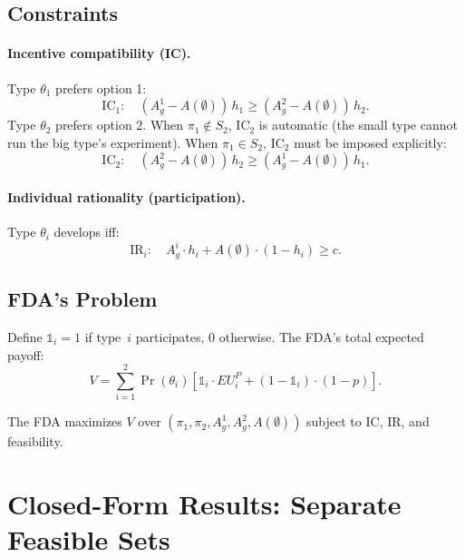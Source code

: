 \documentclass[12pt,a4paper]{article}
\begin{document}
\subsection{Constraints}

\paragraph{Incentive compatibility (IC).}
Type $\theta_1$ prefers option 1:
\begin{equation}\label{eq:IC1}
  \text{IC}_1: \quad
  (A_g^1 - A(\emptyset)) \, h_1
  \geq
  (A_g^2 - A(\emptyset)) \, h_2.
\end{equation}
Type $\theta_2$ prefers option 2. When
$\pi_1 \notin S_2$, $\mathrm{IC}_2$ is automatic (the small
type cannot run the big type's experiment). When
$\pi_1 \in S_2$, $\mathrm{IC}_2$ must be imposed explicitly:
\begin{equation}\label{eq:IC2}
  \text{IC}_2: \quad
  (A_g^2 - A(\emptyset)) \, h_2
  \geq
  (A_g^1 - A(\emptyset)) \, h_1.
\end{equation}

\paragraph{Individual rationality (participation).}
Type $\theta_i$ develops iff:
\begin{equation}\label{eq:IR}
  \text{IR}_i: \quad
  A_g^i \cdot h_i + A(\emptyset) \cdot (1 - h_i) \geq c.
\end{equation}


\subsection{FDA's Problem}

Define $\mathbb{1}_i = 1$ if type~$i$ participates, $0$
otherwise. The FDA's total expected payoff:
\begin{equation}\label{eq:fda_total}
  V = \sum_{i=1}^{2} \Pr(\theta_i) \left[
    \mathbb{1}_i \cdot EU^P_i
    + (1 - \mathbb{1}_i) \cdot (1-p)
  \right].
\end{equation}

The FDA maximizes $V$ over
$(\pi_1, \pi_2, A_g^1, A_g^2, A(\emptyset))$ subject to IC,
IR, and feasibility.


\section{Closed-Form Results: Separate Feasible Sets}
\label{sec:closed}
\end{document}
